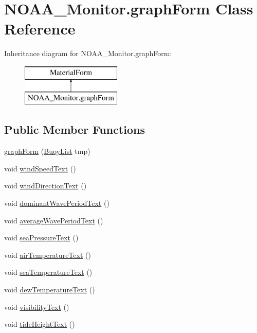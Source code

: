 \hypertarget{class_n_o_a_a___monitor_1_1graph_form}{}\section{N\+O\+A\+A\+\_\+\+Monitor.\+graph\+Form Class Reference}
\label{class_n_o_a_a___monitor_1_1graph_form}
Inheritance diagram for N\+O\+A\+A\+\_\+\+Monitor.\+graph\+Form\+:\begin{figure}[H]
\begin{center}
\leavevmode
\includegraphics[height=2.000000cm]{class_n_o_a_a___monitor_1_1graph_form}
\end{center}
\end{figure}
\subsection*{Public Member Functions}
\begin{DoxyCompactItemize}
\item 
\mbox{\hyperlink{class_n_o_a_a___monitor_1_1graph_form_a68c6d68e2948df9bc77d6f3d097ee069}{graph\+Form}} (\mbox{\hyperlink{class_buoy_list}{Buoy\+List}} tmp)
\item 
void \mbox{\hyperlink{class_n_o_a_a___monitor_1_1graph_form_a3bad905cbd2cc4f92c5198943d3e3339}{wind\+Speed\+Text}} ()
\item 
void \mbox{\hyperlink{class_n_o_a_a___monitor_1_1graph_form_a88390ff163a7aef5b5f5a653f2b3452e}{wind\+Direction\+Text}} ()
\item 
void \mbox{\hyperlink{class_n_o_a_a___monitor_1_1graph_form_aff28dc3c6bea6ba1fc33f0620c83a277}{dominant\+Wave\+Period\+Text}} ()
\item 
void \mbox{\hyperlink{class_n_o_a_a___monitor_1_1graph_form_ad03af9421d83d6b59ea3a95852a818dd}{average\+Wave\+Period\+Text}} ()
\item 
void \mbox{\hyperlink{class_n_o_a_a___monitor_1_1graph_form_a4b7a6e4f7b99e2cdd178c2755d593a36}{sea\+Pressure\+Text}} ()
\item 
void \mbox{\hyperlink{class_n_o_a_a___monitor_1_1graph_form_a9a7c2bc645a76256d6326777e258f5da}{air\+Temperature\+Text}} ()
\item 
void \mbox{\hyperlink{class_n_o_a_a___monitor_1_1graph_form_a84b5aeb8cb6c0f75289859f7a8d35a3b}{sea\+Temperature\+Text}} ()
\item 
void \mbox{\hyperlink{class_n_o_a_a___monitor_1_1graph_form_ab43bde183f09b6f4a854c361890265f3}{dew\+Temperature\+Text}} ()
\item 
void \mbox{\hyperlink{class_n_o_a_a___monitor_1_1graph_form_a3501fbf78761a0d1ff1a9a22326355ba}{visibility\+Text}} ()
\item 
void \mbox{\hyperlink{class_n_o_a_a___monitor_1_1graph_form_ae941bbbf25f512fddd3dad5cb74437d2}{tide\+Height\+Text}} ()
\end{DoxyCompactItemize}

